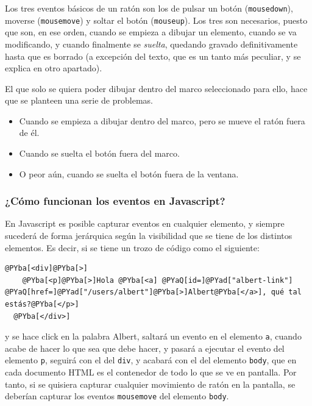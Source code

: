 Los tres eventos básicos de un ratón son los de pulsar un botón (\texttt{mousedown}), moverse (\texttt{mousemove}) y soltar el botón (\texttt{mouseup}). Los tres son necesarios, puesto que son, en ese orden, cuando se empieza a dibujar un elemento, cuando se va modificando, y cuando finalmente se \emph{suelta}, quedando gravado definitivamente hasta que es borrado (a excepción del texto, que es un tanto más peculiar, y se explica en otro apartado).

El que solo se quiera poder dibujar dentro del marco seleccionado para ello, hace que se planteen una serie de problemas.

\begin{itemize}
  \item Cuando se empieza a dibujar dentro del marco, pero se mueve el ratón fuera de él.
  \item Cuando se suelta el botón fuera del marco.
  \item O peor aún, cuando se suelta el botón fuera de la ventana.
\end{itemize}

\subsubsection{¿Cómo funcionan los eventos en Javascript?} %
\label{ssub:como_funcionan_los_eventos}

En Javascript es posible capturar eventos en cualquier elemento, y siempre sucederá de forma jerárquica según la visibilidad que se tiene de los distintos elementos. Es decir, si se tiene un trozo de código como el siguiente:
\begin{Verbatim}[commandchars=@\[\]]
  @PYba[<div]@PYba[>]
    @PYba[<p]@PYba[>]Hola @PYba[<a] @PYaQ[id=]@PYad["albert-link"] @PYaQ[href=]@PYad["/users/albert"]@PYba[>]Albert@PYba[</a>], qué tal estás?@PYba[</p>]
  @PYba[</div>]
\end{Verbatim}


y se hace click en la palabra Albert, saltará un evento en el elemento \texttt{a}, cuando acabe de hacer lo que sea que debe hacer, y pasará a ejecutar el evento del elemento \texttt{p}, seguirá con el del \texttt{div}, y acabará con el del elemento \texttt{body}, que en cada documento HTML es el contenedor de todo lo que se ve en pantalla. Por tanto, si se quisiera capturar cualquier movimiento de ratón en la pantalla, se deberían capturar los eventos \texttt{mousemove} del elemento \texttt{body}.

